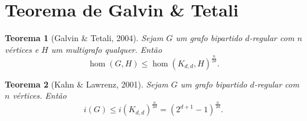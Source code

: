 \documentclass{amsart}
\theoremstyle{theorem}
\newtheorem{teorema}{Teorema}[section]
\theoremstyle{definition}
\theoremstyle{remark}
\numberwithin{equation}{section}
\newcommand{\ii}[1]{\mathrm{\textit{i}} #1}
\begin{document}
\section{Teorema de Galvin \& Tetali}

\begin{teorema}[Galvin \& Tetali, 2004]
  Sejam $G$ um grafo bipartido $d$-regular com $n$ v\'{e}rtices e $H$ um multigrafo qualquer. Ent\~{a}o
  \begin{equation}
    \hom(G,H) \leq \hom(K_{d,d},H)^{\frac{n}{2d}}.
  \end{equation}
\end{teorema}


\begin{teorema}[Kahn \& Lawrenz, 2001]
  Sejam $G$ um grafo bipartido $d$-regular com $n$ v\'{e}rtices. Ent\~{a}o
  \begin{equation}
    \ii(G) \leq \ii(K_{d,d})^{\frac{n}{2d}} = (2^{d+1}-1)^{\frac{n}{2d}}.
  \end{equation}
\end{teorema}




\end{document}
